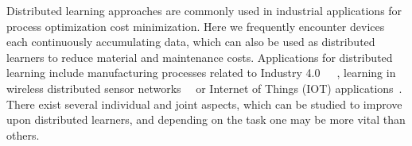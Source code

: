 





Distributed learning approaches are commonly used in industrial applications for process optimization cost minimization. 
Here we frequently encounter devices each continuously accumulating data, which can also be used as distributed learners to reduce material and maintenance costs.
Applications for distributed learning include manufacturing processes related to Industry 4.0~\cite{kreitlein2015green}~\cite{guglielmino2001moving}~\cite{faller2015industry}, learning in wireless distributed sensor networks~\cite{maleki2010energy}~\cite{predd2006distributed} or Internet of Things (IOT) applications~\cite{roman2013features}.
There exist several individual and joint aspects, which can be studied to improve upon distributed learners, and depending on the task one may be more vital than others.

